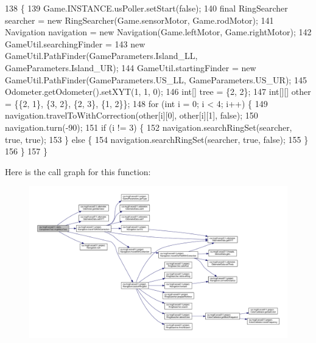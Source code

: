 \begin{DoxyCode}
138                                                                \{
139     Game.INSTANCE.usPoller.setStart(\textcolor{keyword}{false});
140     \textcolor{keyword}{final} RingSearcher searcher = \textcolor{keyword}{new} RingSearcher(Game.sensorMotor, Game.rodMotor);
141     Navigation navigation = \textcolor{keyword}{new} Navigation(Game.leftMotor, Game.rightMotor);
142     GameUtil.searchingFinder =
143         \textcolor{keyword}{new} GameUtil.PathFinder(GameParameters.Island\_LL, GameParameters.Island\_UR);
144     GameUtil.startingFinder = \textcolor{keyword}{new} GameUtil.PathFinder(GameParameters.US\_LL, GameParameters.US\_UR);
145     Odometer.getOdometer().setXYT(1, 1, 0);
146     \textcolor{keywordtype}{int}[] tree = \{2, 2\};
147     \textcolor{keywordtype}{int}[][] other = \{\{2, 1\}, \{3, 2\}, \{2, 3\}, \{1, 2\}\};
148     \textcolor{keywordflow}{for} (\textcolor{keywordtype}{int} i = 0; i < 4; i++) \{
149       navigation.travelToWithCorrection(other[i][0], other[i][1], \textcolor{keyword}{false});
150       navigation.turn(-90);
151       \textcolor{keywordflow}{if} (i != 3) \{
152         navigation.searchRingSet(searcher, \textcolor{keyword}{true}, \textcolor{keyword}{true});
153       \} \textcolor{keywordflow}{else} \{
154         navigation.searchRingSet(searcher, \textcolor{keyword}{true}, \textcolor{keyword}{false});
155       \}
156     \}
157   \}
\end{DoxyCode}
Here is the call graph for this function\+:\nopagebreak
\begin{figure}[H]
\begin{center}
\leavevmode
\includegraphics[width=350pt]{enumca_1_1mcgill_1_1ecse211_1_1tests_1_1_component_test_a1ecca45b47067d825683cf46dcf22b62_cgraph}
\end{center}
\end{figure}
